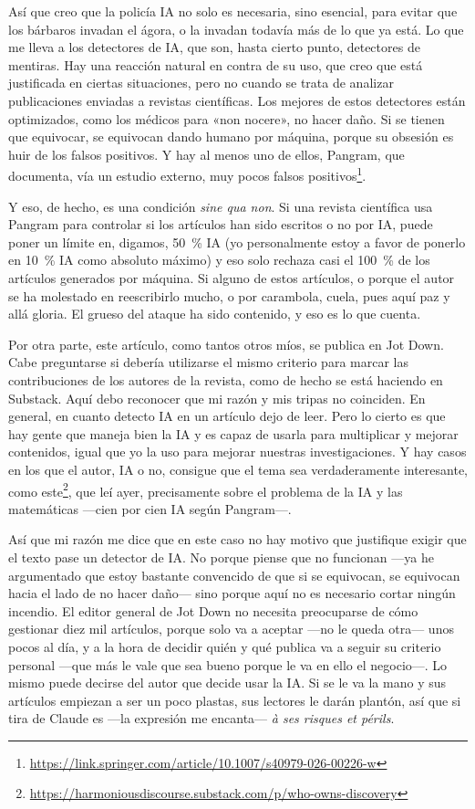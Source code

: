 \documentclass[11pt,a4paper]{article}
\begin{document}
Así que creo que la policía IA no solo es necesaria, sino esencial, para evitar que los bárbaros invadan el ágora, o la invadan todavía más de lo que ya está. Lo que me lleva a los detectores de IA, que son, hasta cierto punto, detectores de mentiras. Hay una reacción natural en contra de su uso, que creo que está justificada en ciertas situaciones, pero no cuando se trata de analizar publicaciones enviadas a revistas científicas. Los mejores de estos detectores están optimizados, como los médicos para «non nocere», no hacer daño. Si se tienen que equivocar, se equivocan dando humano por máquina, porque su obsesión es huir de los falsos positivos. Y hay al menos uno de ellos, Pangram, que documenta, vía un estudio externo, muy pocos falsos positivos\footnote{\url{https://link.springer.com/article/10.1007/s40979-026-00226-w}}.

Y eso, de hecho, es una condición \emph{sine qua non}. Si una revista científica usa Pangram para controlar si los artículos han sido escritos o no por IA, puede poner un límite en, digamos, 50~\% IA (yo personalmente estoy a favor de ponerlo en 10~\% IA como absoluto máximo) y eso solo rechaza casi el 100~\% de los artículos generados por máquina. Si alguno de estos artículos, o porque el autor se ha molestado en reescribirlo mucho, o por carambola, cuela, pues aquí paz y allá gloria. El grueso del ataque ha sido contenido, y eso es lo que cuenta.

Por otra parte, este artículo, como tantos otros míos, se publica en Jot Down. Cabe preguntarse si debería utilizarse el mismo criterio para marcar las contribuciones de los autores de la revista, como de hecho se está haciendo en Substack. 
Aquí debo reconocer que mi razón y mis tripas no coinciden. En general, en cuanto detecto IA en un artículo dejo de leer. Pero lo cierto es que hay gente que maneja bien la IA y es capaz de usarla para multiplicar y mejorar contenidos, igual que yo la uso para mejorar nuestras investigaciones. Y hay casos en los que el autor, IA o no, consigue que el tema sea verdaderamente interesante, como este\footnote{\url{https://harmoniousdiscourse.substack.com/p/who-owns-discovery}}, que leí ayer, precisamente sobre el problema de la IA y las matemáticas ---cien por cien IA según Pangram---.

Así que mi razón me dice que en este caso no hay motivo que justifique exigir que el texto pase un detector de IA. No porque piense que no funcionan ---ya he argumentado que estoy bastante convencido de que si se equivocan, se equivocan hacia el lado de no hacer daño--- sino porque aquí no es necesario cortar ningún incendio. El editor general de Jot Down no necesita preocuparse de cómo gestionar diez mil artículos, porque solo va a aceptar ---no le queda otra--- unos pocos al día, y a la hora de decidir quién y qué publica va a seguir su criterio personal ---que más le vale que sea bueno porque le va en ello el negocio---. Lo mismo puede decirse del autor que decide usar la IA. Si se le va la mano y sus artículos empiezan a ser un poco plastas, sus lectores le darán plantón, así que si tira de Claude es ---la expresión me encanta--- \emph{à ses risques et périls}.
\end{document}
